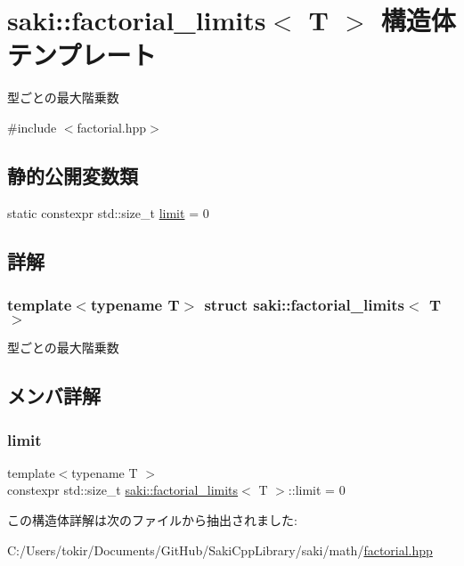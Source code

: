 \hypertarget{structsaki_1_1factorial__limits}{}\section{saki\+:\+:factorial\+\_\+limits$<$ T $>$ 構造体テンプレート}
\label{structsaki_1_1factorial__limits}


型ごとの最大階乗数  




{\ttfamily \#include $<$factorial.\+hpp$>$}

\subsection*{静的公開変数類}
\begin{DoxyCompactItemize}
\item 
static constexpr std\+::size\+\_\+t \mbox{\hyperlink{structsaki_1_1factorial__limits_a4de6af7c2dbba5a689141708258cf19c}{limit}} = 0
\end{DoxyCompactItemize}


\subsection{詳解}
\subsubsection*{template$<$typename T$>$\newline
struct saki\+::factorial\+\_\+limits$<$ T $>$}

型ごとの最大階乗数 

\subsection{メンバ詳解}
\mbox{\label{structsaki_1_1factorial__limits_a4de6af7c2dbba5a689141708258cf19c}} 
\subsubsection{\texorpdfstring{limit}{limit}}
{\footnotesize\ttfamily template$<$typename T $>$ \\
constexpr std\+::size\+\_\+t \mbox{\hyperlink{structsaki_1_1factorial__limits}{saki\+::factorial\+\_\+limits}}$<$ T $>$\+::limit = 0\hspace{0.3cm}{\ttfamily [static]}}



この構造体詳解は次のファイルから抽出されました\+:\begin{DoxyCompactItemize}
\item 
C\+:/\+Users/tokir/\+Documents/\+Git\+Hub/\+Saki\+Cpp\+Library/saki/math/\mbox{\hyperlink{factorial_8hpp}{factorial.\+hpp}}\end{DoxyCompactItemize}
